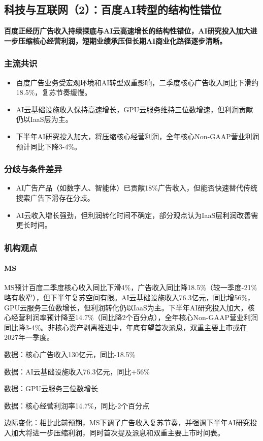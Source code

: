 \documentclass[11pt]{ctexart}
\begin{document}
\subsection{科技与互联网（2）：百度AI转型的结构性错位}
\textbf{百度正经历广告收入持续探底与AI云高速增长的结构性错位，AI研究投入加大进一步压缩核心经营利润，短期业绩承压但长期AI商业化路径逐步清晰。}
\subsubsection*{主流共识}
\begin{itemize}
  \item 百度广告业务受宏观环境和AI转型双重影响，二季度核心广告收入同比下滑约18.5\%，复苏节奏缓慢。
  \item AI云基础设施收入保持高速增长，GPU云服务维持三位数增速，但利润贡献仍以IaaS层为主。
  \item 下半年AI研究投入加大，将压缩核心经营利润，全年核心Non-GAAP营业利润预计同比下降3-4\%。
\end{itemize}
\subsubsection*{分歧与条件差异}
\begin{itemize}
  \item AI广告产品（如数字人、智能体）已贡献18\%广告收入，但能否快速替代传统搜索广告下滑存在分歧。
  \item AI云收入增长强劲，但利润转化时间不确定，部分观点认为IaaS层利润改善需更长时间。
\end{itemize}
\subsubsection*{机构观点}
\paragraph{MS} MS预计百度二季度核心收入同比下滑4\%，广告收入同比降18.5\%（较一季度-21\%略有收窄），但下半年复苏空间有限。AI云基础设施收入76.3亿元，同比增56\%，GPU云服务三位数增长，但利润转化仍以IaaS为主。下半年AI研究投入加大，核心经营利润率预计降至14.7\%（同比降2个百分点），全年核心Non-GAAP营业利润同比降3-4\%。非核心资产剥离推进中，年底有望首次派息，双重主要上市或在2027年一季度。
{\small\color{refgray}数据：核心广告收入130亿元，同比-18.5\%\par}
{\small\color{refgray}数据：AI云基础设施收入76.3亿元，同比+56\%\par}
{\small\color{refgray}数据：GPU云服务三位数增长\par}
{\small\color{refgray}数据：核心经营利润率14.7\%，同比-2个百分点\par}
{\small\color{refgray}边际变化：相比此前预期，MS下调了广告收入复苏节奏，并强调下半年AI研究投入加大将进一步压缩利润，同时首次提及派息和双重主要上市时间表。\par}
\end{document}
